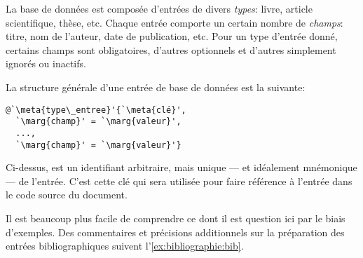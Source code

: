 La base de données est composée d'entrées de divers \emph{types}:
livre, article scientifique, thèse, etc. Chaque entrée comporte un
certain nombre de \emph{champs}: titre, nom de l'auteur, date de
publication, etc. Pour un type d'entrée donné, certains champs sont
obligatoires, d'autres optionnels et d'autres simplement ignorés ou
inactifs.

La structure générale d'une entrée de base de données est la suivante:
\begin{lstlisting}
@`\meta{type\_entree}'{`\meta{clé}',
  `\marg{champ}' = `\marg{valeur}',
  ...,
  `\marg{champ}' = `\marg{valeur}'}
\end{lstlisting}
Ci-dessus,  est un identifiant arbitraire, mais unique ---
et idéalement mnémonique --- de l'entrée. C'est cette clé qui sera
utilisée pour faire référence à l'entrée dans le code source du
document.

Il est beaucoup plus facile de comprendre ce dont il est question ici
par le biais d'exemples. Des commentaires et précisions additionnels sur la
préparation des entrées bibliographiques suivent l'\autoref{ex:bibliographie:bib}.

